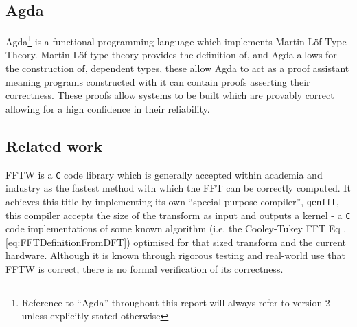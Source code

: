 


\subsection{Agda}
Agda\footnote{Reference to ``Agda'' throughout this report will always refer to version 2 unless explicitly stated otherwise} is a functional programming language which implements Martin-Löf Type Theory.\cite{Norell2007}\cite{Martin-Lf1984}
Martin-Löf type theory provides the definition of, and Agda allows for the construction of, dependent types, these allow Agda to act as a proof assistant meaning programs constructed with it can contain proofs asserting their correctness.
These proofs allow systems to be built which are provably correct allowing for a high confidence in their reliability.\cite{Norell2007}

\subsection{Related work}
FFTW\cite{Frigo2005} is a \verb|C| code library which is generally accepted within academia and industry as the fastest method with which the FFT can be correctly computed.\cite{Frigo1999} 
It achieves this title by implementing its own ``special-purpose compiler''\cite{Frigo1999}, \verb|genfft|, this compiler accepts the size of the transform as input and outputs a kernel - a \verb|C| code implementations of some known algorithm (i.e. the Cooley-Tukey FFT \cite{Cooley1965} Eq .\ref{eq:FFTDefinitionFromDFT}) optimised for that sized transform and the current hardware.\cite{Frigo1999} 
Although it is known through rigorous testing and real-world use that FFTW is correct, there is no formal verification of its correctness. %

